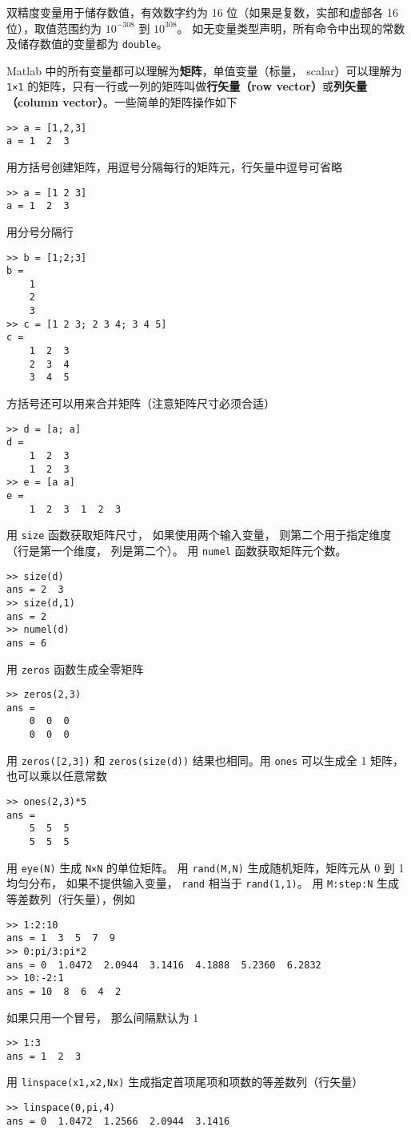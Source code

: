 双精度变量用于储存数值，有效数字约为 16 位（如果是复数，实部和虚部各 16 位），取值范围约为 $10^{-308}$ 到 $10^{308}$。 如无变量类型声明，所有命令中出现的常数及储存数值的变量都为 \verb|double|。

Matlab 中的所有变量都可以理解为\textbf{矩阵}，单值变量（标量， scalar）可以理解为 \verb|1×1| 的矩阵，只有一行或一列的矩阵叫做\textbf{行矢量（row vector）}或\textbf{列矢量（column vector）}。一些简单的矩阵操作如下
\begin{lstlisting}[language=matlabC]
>> a = [1,2,3]
a = 1  2  3
\end{lstlisting}
用方括号创建矩阵，用逗号分隔每行的矩阵元，行矢量中逗号可省略%
\begin{lstlisting}[language=matlabC]
>> a = [1 2 3]
a = 1  2  3
\end{lstlisting}
用分号分隔行
\begin{lstlisting}[language=matlabC]
>> b = [1;2;3]
b =
    1
    2
    3
>> c = [1 2 3; 2 3 4; 3 4 5]
c =
    1  2  3
    2  3  4
    3  4  5
\end{lstlisting}
方括号还可以用来合并矩阵（注意矩阵尺寸必须合适）
\begin{lstlisting}[language=matlabC]
>> d = [a; a]
d =
    1  2  3
    1  2  3
>> e = [a a]
e =
    1  2  3  1  2  3
\end{lstlisting}
用 \verb|size| 函数获取矩阵尺寸， 如果使用两个输入变量， 则第二个用于指定维度（行是第一个维度， 列是第二个）。 用 \verb|numel| 函数获取矩阵元个数。
\begin{lstlisting}[language=matlabC]
>> size(d)
ans = 2  3
>> size(d,1)
ans = 2
>> numel(d)
ans = 6
\end{lstlisting}
用 \verb|zeros| 函数生成全零矩阵
\begin{lstlisting}[language=matlabC]
>> zeros(2,3)
ans =
    0  0  0
    0  0  0
\end{lstlisting}
用 \verb|zeros([2,3])| 和 \verb|zeros(size(d))| 结果也相同。用 \verb|ones| 可以生成全 1 矩阵，也可以乘以任意常数
\begin{lstlisting}[language=matlabC]
>> ones(2,3)*5
ans =
    5  5  5
    5  5  5
\end{lstlisting}
用 \verb|eye(N)| 生成 \verb|N×N| 的单位矩阵。 用 \verb|rand(M,N)| 生成随机矩阵，矩阵元从 0 到 1 均匀分布， 如果不提供输入变量， \verb|rand| 相当于 \verb|rand(1,1)|。 用 \verb|M:step:N| 生成等差数列（行矢量），例如
\begin{lstlisting}[language=matlabC]
>> 1:2:10
ans = 1  3  5  7  9
>> 0:pi/3:pi*2
ans = 0  1.0472  2.0944  3.1416  4.1888  5.2360  6.2832
>> 10:-2:1
ans = 10  8  6  4  2
\end{lstlisting}
如果只用一个冒号， 那么间隔默认为 1
\begin{lstlisting}[language=matlabC]
>> 1:3
ans = 1  2  3
\end{lstlisting}
用 \verb|linspace(x1,x2,Nx)| 生成指定首项尾项和项数的等差数列（行矢量）
\begin{lstlisting}[language=matlabC]
>> linspace(0,pi,4)
ans = 0  1.0472  1.2566  2.0944  3.1416
\end{lstlisting}

